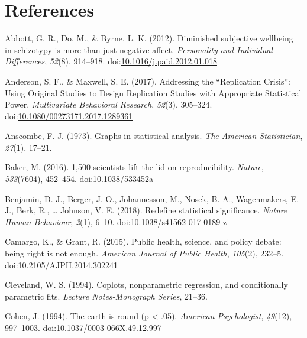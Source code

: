 \documentclass[
  man]{apa6}
\begin{document}
\hypertarget{references}{%
\section{References}\label{references}}

\begingroup
\setlength{\parindent}{-0.5in}
\setlength{\leftskip}{0.5in}

\hypertarget{refs}{}
\leavevmode\hypertarget{ref-Abbott2012}{}%
Abbott, G. R., Do, M., \& Byrne, L. K. (2012). Diminished subjective wellbeing in schizotypy is more than just negative affect. \emph{Personality and Individual Differences}, \emph{52}(8), 914--918. doi:\href{https://doi.org/10.1016/j.paid.2012.01.018}{10.1016/j.paid.2012.01.018}

\leavevmode\hypertarget{ref-Anderson2017}{}%
Anderson, S. F., \& Maxwell, S. E. (2017). Addressing the ``Replication Crisis'': Using Original Studies to Design Replication Studies with Appropriate Statistical Power. \emph{Multivariate Behavioral Research}, \emph{52}(3), 305--324. doi:\href{https://doi.org/10.1080/00273171.2017.1289361}{10.1080/00273171.2017.1289361}

\leavevmode\hypertarget{ref-anscombe1973graphs}{}%
Anscombe, F. J. (1973). Graphs in statistical analysis. \emph{The American Statistician}, \emph{27}(1), 17--21.

\leavevmode\hypertarget{ref-Baker2016a}{}%
Baker, M. (2016). 1,500 scientists lift the lid on reproducibility. \emph{Nature}, \emph{533}(7604), 452--454. doi:\href{https://doi.org/10.1038/533452a}{10.1038/533452a}

\leavevmode\hypertarget{ref-Benjamin2018}{}%
Benjamin, D. J., Berger, J. O., Johannesson, M., Nosek, B. A., Wagenmakers, E.-J., Berk, R., \ldots{} Johnson, V. E. (2018). Redefine statistical significance. \emph{Nature Human Behaviour}, \emph{2}(1), 6--10. doi:\href{https://doi.org/10.1038/s41562-017-0189-z}{10.1038/s41562-017-0189-z}

\leavevmode\hypertarget{ref-Camargo2015}{}%
Camargo, K., \& Grant, R. (2015). Public health, science, and policy debate: being right is not enough. \emph{American Journal of Public Health}, \emph{105}(2), 232--5. doi:\href{https://doi.org/10.2105/AJPH.2014.302241}{10.2105/AJPH.2014.302241}

\leavevmode\hypertarget{ref-Cleveland1994}{}%
Cleveland, W. S. (1994). Coplots, nonparametric regression, and conditionally parametric fits. \emph{Lecture Notes-Monograph Series}, 21--36.

\leavevmode\hypertarget{ref-cohen_earth_1994}{}%
Cohen, J. (1994). The earth is round (p \textless{} .05). \emph{American Psychologist}, \emph{49}(12), 997--1003. doi:\href{https://doi.org/10.1037/0003-066X.49.12.997}{10.1037/0003-066X.49.12.997}
\end{document}
